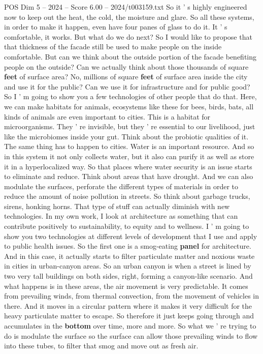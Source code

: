 \begin{textsample}{POS Dim 5 – 2024 – Score 6.00 – 2024/t003159.txt}
So it ' s highly engineered now to keep out the heat, the cold, the moisture and glare.
So all these systems, in order to make it happen, even have four panes of glass to do it.
It ' s comfortable, it works.
But what do we do next?
So I would like to propose that that thickness of the facade still be used to make people on the inside comfortable.
But can we think about the outside portion of the facade benefiting people on the outside?
Can we actually think about those thousands of square \textbf{feet} of surface area?
No, millions of square \textbf{feet} of surface area inside the city and use it for the public?
Can we use it for infrastructure and for public good?
So I ' m going to show you a few technologies of other people that do that.
Here, we can make habitats for animals, ecosystems like these for bees, birds, bats, all kinds of animals are even important to cities.
This is a habitat for microorganisms.
They ' re invisible, but they ' re essential to our livelihood, just like the microbiomes inside your gut.
Think about the probiotic qualities of it.
The same thing has to happen to cities.
Water is an important resource.
And so in this system it not only collects water, but it also can purify it as well as store it in a hyperlocalized way.
So that places where water security is an issue starts to eliminate and reduce.
Think about areas that have drought.
And we can also modulate the surfaces, perforate the different types of materials in order to reduce the amount of noise pollution in streets.
So think about garbage trucks, sirens, honking horns.
That type of stuff can actually diminish with new technologies.
In my own work, I look at architecture as something that can contribute positively to sustainability, to equity and to wellness.
I ' m going to show you two technologies at different levels of development that I use and apply to public health issues.
So the first one is a smog-eating \textbf{panel} for architecture.
And in this case, it actually starts to filter particulate matter and noxious waste in cities in urban-canyon areas.
So an urban canyon is when a street is lined by two very tall buildings on both sides, right, forming a canyon-like scenario.
And what happens is in these areas, the air movement is very predictable.
It comes from prevailing winds, from thermal convection, from the movement of vehicles in there.
And it moves in a circular pattern where it makes it very difficult for the heavy particulate matter to escape.
So therefore it just keeps going through and accumulates in the \textbf{bottom} over time, more and more.
So what we ' re trying to do is modulate the surface so the surface can allow those prevailing winds to flow into these tubes, to filter that smog and move out as fresh air.

\end{textsample}
